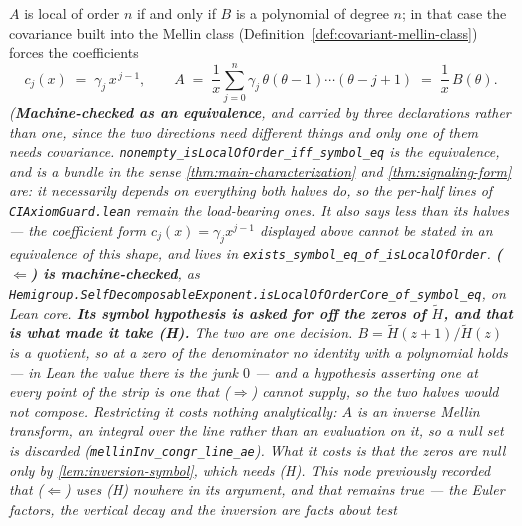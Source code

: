 \begin{lemma}[covariant local = polynomial symbol]\label{lem:local-polynomial-symbol}
\leanok
$A$ is local of order $n$ if and only if $B$ is a polynomial of degree $n$; in that case the
covariance built into the Mellin class (Definition~\ref{def:covariant-mellin-class}) forces the
coefficients
\[
  c_j(x) \;=\; \gamma_j\, x^{\,j-1}, \qquad
  A \;=\; \frac{1}{x}\sum_{j=0}^n \gamma_j\,\theta(\theta-1)\cdots(\theta-j+1)
  \;=\; \frac{1}{x}\,B(\theta).
\]
\statusT\quad\emph{(\textbf{Machine-checked as an equivalence}, and carried by three
declarations rather than one, since the two directions need different things and only one of them
needs covariance. \texttt{nonempty\_isLocalOfOrder\_iff\_symbol\_eq} is the equivalence, and is a
\emph{bundle} in the sense \ref{thm:main-characterization} and \ref{thm:signaling-form} are: it
necessarily depends on everything both halves do, so the per-half lines of
\texttt{CIAxiomGuard.lean} remain the load-bearing ones. It also says \emph{less} than its halves
--- the coefficient form $c_j(x) = \gamma_j x^{j-1}$ displayed above cannot be stated in an
equivalence of this shape, and lives in \texttt{exists\_symbol\_eq\_of\_isLocalOfOrder}.
\textbf{($\Leftarrow$) is machine-checked}, as
\texttt{Hemigroup.SelfDecomposableExponent.isLocalOfOrderCore\_of\_symbol\_eq}, on Lean core.
\textbf{Its symbol hypothesis is asked for off the zeros of $\tilde H$, and that is what
made it take (H).} The two are one decision. $B = \tilde H(z{+}1)/\tilde H(z)$ is a quotient, so
at a zero of the denominator no identity with a polynomial holds --- in Lean the value there is
the junk $0$ --- and a hypothesis asserting one at \emph{every} point of the strip is one that
($\Rightarrow$) cannot supply, so the two halves would not compose. Restricting it costs nothing
analytically: $A$ is an inverse Mellin transform, an integral \emph{over} the line rather than an
evaluation on it, so a null set is discarded (\texttt{mellinInv\_congr\_line\_ae}). What it costs
is that the zeros are null only by \ref{lem:inversion-symbol}, which needs (H).
This node previously recorded that ($\Leftarrow$) uses (H) nowhere in its argument, and that
remains true --- the Euler factors, the vertical decay and the inversion are facts about test
}
\end{lemma}
